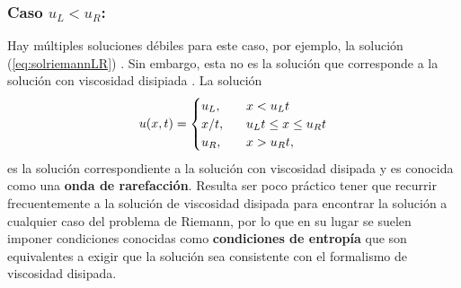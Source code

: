\subsubsection{Caso $u_L < u_R$:}
Hay múltiples soluciones débiles para este caso, por ejemplo, la solución (\ref{eq:solriemannLR}) \cite{Cameron}. Sin embargo, esta no es la solución que corresponde a la solución con viscosidad disipiada \cite{Cameron}. La solución
\begin{equation}
	u(x,t) = 
	\begin{cases}
		u_L, & \hspace{3mm} x < u_{L}t \\
		x/t, & \hspace{3mm} u_{L}t \leq x \leq u_{R}t \\
		u_R, & \hspace{3mm} x > u_{R}t,		
	\end{cases}\label{eq:solriemannRL}
\end{equation}
es la solución correspondiente a la solución con viscosidad disipada y es conocida como una \textbf{onda de rarefacción}. Resulta ser poco práctico tener que recurrir frecuentemente a la solución de viscosidad disipada para encontrar la solución a cualquier caso del problema de Riemann, por lo que en su lugar se suelen imponer condiciones conocidas como \textbf{condiciones de entropía} que son equivalentes a exigir que la solución sea consistente con el formalismo de viscosidad disipada.

